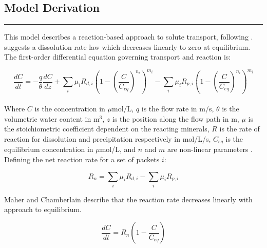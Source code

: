 \FloatBarrier

\newpage
\begin{tcolorbox}[
    colback=white,
    colframe=white,
    sharp corners,
    boxrule=0pt,
    breakable,
    width=\dimexpr\textwidth+1cm\relax,
    enlarge left by=-0.5cm,
    leftrule=0mm, rightrule=0mm, toprule=0mm, bottomrule=0mm
]


\subsection*{\textcite{maherRoleFluidResidence2011} Model Derivation}
\vspace{-5mm}
{\footnotesize

\noindent\rule{\textwidth}{0.5pt}

This model describes a reaction-based approach to solute transport, following \textcite{maherHydrologicRegulationChemical2014}. \textcite{maherRoleFluidResidence2011} suggests a dissolution rate law which decreases linearly to zero at equilibrium. The first-order differential equation governing transport and reaction is:

\begin{equation}
    \frac{dC}{dt} = -\frac{q}{\theta} \frac{dC}{dz} + \sum_i \mu_i R_{d,i} \left( 1 - \left( \frac{C}{C_{eq}} \right)^{n_i} \right)^{m_i} - \sum_i \mu_i R_{p,i} \left( 1 - \left( \frac{C}{C_{eq}} \right)^{n_i} \right)^{m_i}
\end{equation}\\

Where \( C \) is the concentration in $\mu$mol/L, \( q \) is the flow rate in m/s, \( \theta \) is the volumetric water content in m$^3$, \( z \) is the position along the flow path in m, \( \mu \) is the stoichiometric coefficient dependent on the reacting minerals, \( R \) is the rate of reaction for dissolution and precipitation respectively in mol/L/s, \( C_{eq} \) is the equilibrium concentration in $\mu$mol/L, and \( n \) and \( m \) are non-linear parameters \parencite{maherRoleFluidResidence2011}. Defining the net reaction rate for a set of packets $i$:

\begin{equation}
    R_n = \sum_i \mu_i R_{d,i} - \sum_i \mu_i R_{p,i}
\end{equation}

Maher and Chamberlain describe that the reaction rate decreases linearly with approach to equilibrium.

\begin{equation}
    \frac{dC}{dt} = R_n \left( 1 - \frac{C}{C_{eq}} \right)
\end{equation}

}
\end{tcolorbox}
